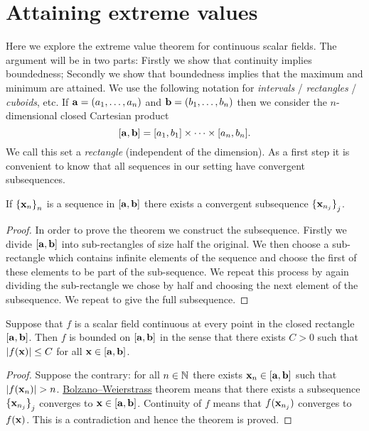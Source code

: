 \section{Attaining extreme values}

Here we explore the extreme value theorem for continuous scalar fields.
The argument will be in two parts:
Firstly we show that continuity implies boundedness;
Secondly we show that boundedness implies that the maximum and minimum are attained.
We use the following notation for \emph{intervals} / \emph{rectangles} / \emph{cuboids}, etc.
If \(\aa = (a_1,\ldots,a_n)\) and  \(\bb = (b_1,\ldots,b_n)\)
then we consider the \(n\)-dimensional closed Cartesian product
\[
    [\aa,\bb] = [a_1,b_1] \times \cdots \times [a_n,b_n].
\]
We call this set a \emph{rectangle} (independent of the dimension).
As a first step it is convenient to know that all sequences in our setting have convergent subsequences.

\begin{theorem}
    If \({\{\xx_{n}\}}_{n}\) is a sequence in \( [\aa,\bb]\)
    there exists a convergent subsequence \({\{\xx_{n_j}\}}_{j}\).
\end{theorem}

\begin{proof}
    In order to prove the theorem we construct the subsequence.
    Firstly we divide \( [\aa,\bb]\) into sub-rectangles of size half the original.
    We then choose a sub-rectangle which contains infinite elements of the sequence and choose the first of these elements to be part of the sub-sequence.
    We repeat this process by again dividing the sub-rectangle we chose by half and choosing the next element of the subsequence.
    We repeat to give the full subsequence.
\end{proof}

\begin{theorem}
    Suppose that \(f\) is a scalar field continuous at every point in the closed rectangle \([\aa,\bb]\).
    Then \(f\) is bounded on \([\aa,\bb]\) in the sense that there exists \(C>0\) such that \(\abs{f(\xx)} \leq C\) for all \(\xx \in [\aa,\bb]\).
\end{theorem}

\begin{proof}
    Suppose the contrary: for all \(n\in\bN\) there exists \(\xx_n\in [\aa,\bb]\) such that \(\abs{f(\xx_n)}>n\).
    \href{https://en.wikipedia.org/wiki/Bolzano%E2%80%93Weierstrass_theorem}{Bolzano–Weierstrass} theorem means that there exists a subsequence \({\{\xx_{n_j}\}}_{j}\) converges to \( \xx \in [\aa,\bb]\).
    Continuity of \(f\) means that \(f(\xx_{n_j})\) converges to \(f(\xx)\). This is a contradiction and hence the theorem is proved.
\end{proof}


